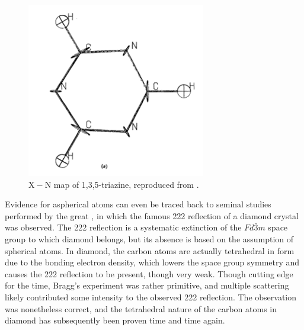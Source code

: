 \begin{refsection}
\begin{figure}
    \centering
    \includegraphics[width=0.5\linewidth]{Figures/x-n-coppens.png}
    \caption{$\mathrm{X}-\mathrm{N}$ map of 1,3,5-triazine, reproduced from \citeauthor{Coppens1968EvidenceEffects}.\autocite{Coppens1968EvidenceEffects}}
    \label{fig:x-n-coppens}
\end{figure}

Evidence for aspherical atoms can even be traced back to seminal studies performed by the great \citeauthor{Bragg1920}, in which the famous 222 reflection of a diamond crystal was observed.
The 222 reflection is a systematic extinction of the $Fd\bar{3}m$ space group to which diamond belongs, but its absence is based on the assumption of spherical atoms.
In diamond, the carbon atoms are actually tetrahedral in form due to the bonding electron density, which lowers the space group symmetry and causes the 222 reflection to be present, though very weak.\autocite{Bragg1920}
Though cutting edge for the time, Bragg's experiment was rather primitive, and multiple scattering likely contributed some intensity to the observed 222 reflection.
The observation was nonetheless correct, and the tetrahedral nature of the carbon atoms in diamond has subsequently been proven time and time again.


\end{refsection}
